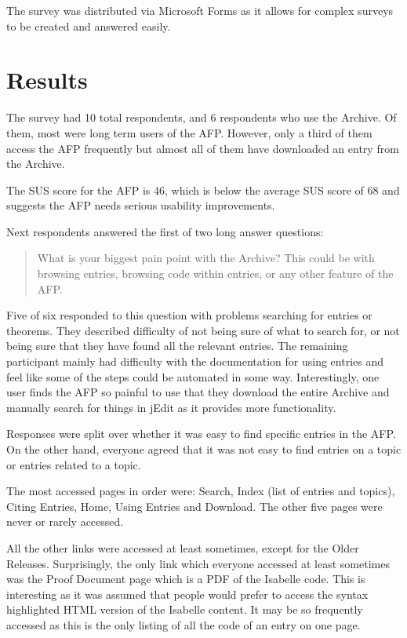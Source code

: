 \documentclass[bsc,frontabs,oneside,singlespacing,parskip,deptreport,logo]{infthesis}
\begin{document}
The survey was distributed via Microsoft Forms as it allows for complex surveys to be created and answered easily.

\section{Results}

The survey had 10 total respondents, and 6 respondents who use the Archive. Of them, most were long term users of the AFP\@. However, only a third of them access the AFP frequently but almost all of them have downloaded an entry from the Archive.

The SUS score for the AFP is 46, which is below the average SUS score of 68 and suggests the AFP needs serious usability improvements.

Next respondents answered the first of two long answer questions: 
\begin{quote}
    What is your biggest pain point with the Archive? This could be with browsing entries, browsing code within entries, or any other feature of the AFP\@.
\end{quote}
Five of six responded to this question with problems searching for entries or theorems. They described difficulty of not being sure of what to search for, or not being sure that they have found all the relevant entries. The remaining participant mainly had difficulty with the documentation for using entries and feel like some of the steps could be automated in some way. Interestingly, one user finds the AFP so painful to use that they download the entire Archive and manually search for things in jEdit as it provides more functionality.

Responses were split over whether it was easy to find specific entries in the AFP\@. On the other hand, everyone agreed that it was not easy to find entries on a topic or entries related to a topic.

The most accessed pages in order were: Search, Index (list of entries and topics), Citing Entries, Home, Using Entries and Download. The other five pages were never or rarely accessed. 

All the other links were accessed at least sometimes, except for the Older Releases. Surprisingly, the only link which everyone accessed at least sometimes was the Proof Document page which is a PDF of the Isabelle code. This is interesting as it was assumed that people would prefer to access the syntax highlighted HTML version of the Isabelle content. It may be so frequently accessed as this is the only listing of all the code of an entry on one page.
\end{document}
